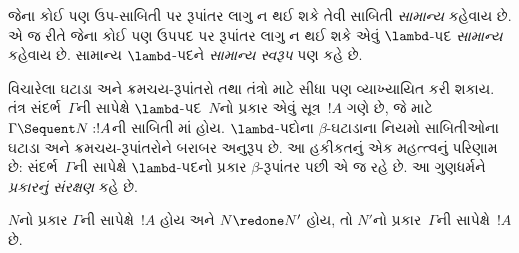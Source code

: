 જેના કોઈ પણ ઉપ-સાબિતી પર રૂપાંતર
લાગુ ન થઈ શકે તેવી સાબિતી
\emph{સામાન્ય} કહેવાય છે.
એ જ રીતે જેના કોઈ પણ ઉપપદ પર
રૂપાંતર લાગુ ન થઈ શકે એવું
$\lambd$-પદ \emph{સામાન્ય} કહેવાય છે.
સામાન્ય $\lambd$-પદને
\emph{સામાન્ય સ્વરૂપ} પણ કહે છે.
\endgroup

\begingroup
\makeatletter{}\makeatother


\label{guunit:OLP-0696}


વિચારેલા ઘટાડા અને ક્રમચય-રૂપાંતરો
 તથા  તંત્રો માટે સીધા પણ વ્યાખ્યાયિત કરી શકાય.
 તંત્ર સંદર્ભ~$\Gamma$ની સાપેક્ષે
$\lambd$-પદ~$N$નો પ્રકાર એવું સૂત્ર~$!A$ ગણે છે,
જે માટે $\Gamma \Sequent N : !A$ની
સાબિતી માં હોય.
$\lambd$-પદોના $\beta$-ઘટાડાના નિયમો
સાબિતીઓના ઘટાડા અને ક્રમચય-રૂપાંતરોને બરાબર અનુરૂપ છે.
આ હકીકતનું એક મહત્ત્વનું પરિણામ છે:
સંદર્ભ~$\Gamma$ની સાપેક્ષે $\lambd$-પદનો પ્રકાર
$\beta$-રૂપાંતર પછી એ જ રહે છે.
આ ગુણધર્મને \emph{પ્રકારનું સંરક્ષણ} કહે છે.

\begin{prop}
$N$નો પ્રકાર $\Gamma$ની સાપેક્ષે~$!A$ હોય
અને $N \redone N'$ હોય,
તો $N'$નો પ્રકાર~$\Gamma$ની સાપેક્ષે~$!A$ છે.
\end{prop}

